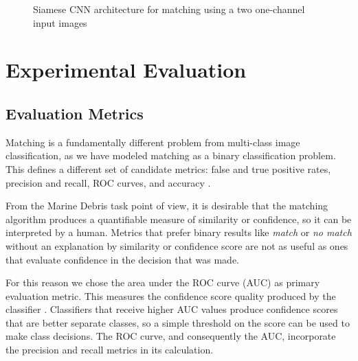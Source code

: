 \begin{figure}[p]
	\vspace*{0.5cm}
	\caption{Siamese CNN architecture for matching using a two one-channel input images}
	\label{mat:siameseCNN}
\end{figure}

\section{Experimental Evaluation}

\subsection{Evaluation Metrics}

Matching is a fundamentally different problem from multi-class image classification, as we have modeled matching as a binary classification problem. This defines a different set of candidate metrics: false and true positive rates, precision and recall, ROC curves, and accuracy \cite{bishop2006pattern}.

From the Marine Debris task point of view, it is desirable that the matching algorithm produces a quantifiable measure of similarity or confidence, so it can be interpreted by a human. Metrics that prefer binary results like \textit{match} or \textit{no match} without an explanation by similarity or confidence score are not as useful as ones that evaluate confidence in the decision that was made.

For this reason we chose the area under the ROC curve (AUC) as primary evaluation metric. This measures the confidence score quality produced by the classifier \cite{murphy2012machine}. Classifiers that receive higher AUC values produce confidence scores that are better separate classes, so a simple threshold on the score can be used to make class decisions. The ROC curve, and consequently the AUC, incorporate the precision and recall metrics in its calculation.

